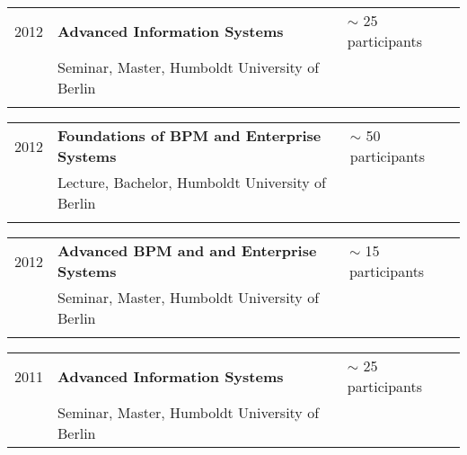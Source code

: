 \begin{tabular}{P{3cm}P{8cm}P{3cm}}		
2012		& \textbf{Advanced Information Systems	}			& $\sim$ 25 participants\\
				& Seminar, Master, Humboldt University of Berlin\\
\\
\end{tabular}
\begin{tabular}{P{3cm}P{8cm}P{3cm}}		
2012		& \textbf{Foundations of BPM and Enterprise Systems}		 & $\sim$ 50 participants\\
				& Lecture, Bachelor, Humboldt University of Berlin\\
\\
\end{tabular}
\begin{tabular}{P{3cm}P{8cm}P{3cm}}		
2012		& \textbf{Advanced BPM and and Enterprise Systems}		& $\sim$ 15 participants\\
				& Seminar, Master, Humboldt University of Berlin\\
\\
\end{tabular}
\begin{tabular}{P{3cm}P{8cm}P{3cm}}		
2011		& \textbf{Advanced Information Systems	}			& $\sim$ 25 participants\\
				& Seminar, Master, Humboldt University of Berlin				\\
\end{tabular}

